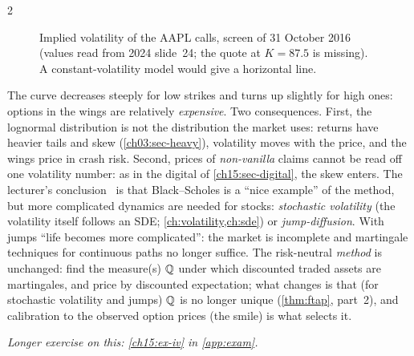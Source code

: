 \begin{paracol}{2}
\begin{figure}[ht]
\centering
{}
\caption{Implied volatility of the AAPL calls, screen of 31 October 2016 (values read from 2024 slide~24; the quote at $K=87.5$ is missing). A constant-volatility model would give a horizontal line.}\label{ch15:fig-smile}
\end{figure}

The curve decreases steeply for low strikes and turns up slightly for high ones: options in the wings are relatively \emph{expensive}. Two consequences. First, the lognormal distribution is not the distribution the market uses: returns have
heavier tails and skew (\cref{ch03:sec-heavy}), volatility moves with the price, and the wings price in crash risk. Second, prices of \emph{non-vanilla} claims cannot be read off one volatility number: as in the digital
of \cref{ch15:sec-digital}, the skew enters. The lecturer's conclusion \ is that Black--Scholes is a ``nice example'' of the method, but more complicated dynamics are needed for stocks: \emph{stochastic volatility}
(the volatility itself follows an SDE; \cref{ch:volatility,ch:sde}) or \emph{jump-diffusion}. With jumps ``life becomes more complicated'': the market is incomplete and martingale
techniques for continuous paths no longer suffice. The risk-neutral \emph{method} is unchanged: find the measure(s) $\mathbb{Q}$ under which discounted traded assets are martingales, and price by discounted expectation; what changes is that (for stochastic volatility and jumps) $\mathbb{Q}$
is no longer unique (\cref{thm:ftap}, part~2), and calibration to the observed option prices (the smile) is what selects it.

\noindent\emph{Longer exercise on this: \cref{ch15:ex-iv} in \cref{app:exam}.}


\end{paracol}
